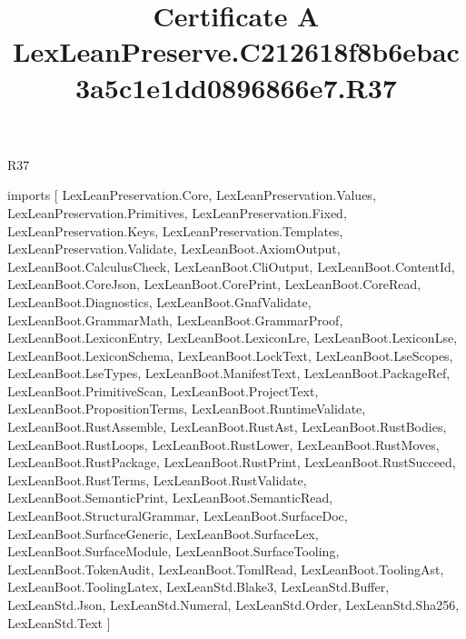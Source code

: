 \begin{lexlean}{R37}
\title{Certificate A LexLeanPreserve.C212618f8b6ebac3a5c1e1dd0896866e7.R37}
\begin{coremodule}
imports [
  LexLeanPreservation.Core,
  LexLeanPreservation.Values,
  LexLeanPreservation.Primitives,
  LexLeanPreservation.Fixed,
  LexLeanPreservation.Keys,
  LexLeanPreservation.Templates,
  LexLeanPreservation.Validate,
  LexLeanBoot.AxiomOutput,
  LexLeanBoot.CalculusCheck,
  LexLeanBoot.CliOutput,
  LexLeanBoot.ContentId,
  LexLeanBoot.CoreJson,
  LexLeanBoot.CorePrint,
  LexLeanBoot.CoreRead,
  LexLeanBoot.Diagnostics,
  LexLeanBoot.GnafValidate,
  LexLeanBoot.GrammarMath,
  LexLeanBoot.GrammarProof,
  LexLeanBoot.LexiconEntry,
  LexLeanBoot.LexiconLre,
  LexLeanBoot.LexiconLse,
  LexLeanBoot.LexiconSchema,
  LexLeanBoot.LockText,
  LexLeanBoot.LseScopes,
  LexLeanBoot.LseTypes,
  LexLeanBoot.ManifestText,
  LexLeanBoot.PackageRef,
  LexLeanBoot.PrimitiveScan,
  LexLeanBoot.ProjectText,
  LexLeanBoot.PropositionTerms,
  LexLeanBoot.RuntimeValidate,
  LexLeanBoot.RustAssemble,
  LexLeanBoot.RustAst,
  LexLeanBoot.RustBodies,
  LexLeanBoot.RustLoops,
  LexLeanBoot.RustLower,
  LexLeanBoot.RustMoves,
  LexLeanBoot.RustPackage,
  LexLeanBoot.RustPrint,
  LexLeanBoot.RustSucceed,
  LexLeanBoot.RustTerms,
  LexLeanBoot.RustValidate,
  LexLeanBoot.SemanticPrint,
  LexLeanBoot.SemanticRead,
  LexLeanBoot.StructuralGrammar,
  LexLeanBoot.SurfaceDoc,
  LexLeanBoot.SurfaceGeneric,
  LexLeanBoot.SurfaceLex,
  LexLeanBoot.SurfaceModule,
  LexLeanBoot.SurfaceTooling,
  LexLeanBoot.TokenAudit,
  LexLeanBoot.TomlRead,
  LexLeanBoot.ToolingAst,
  LexLeanBoot.ToolingLatex,
  LexLeanStd.Blake3,
  LexLeanStd.Buffer,
  LexLeanStd.Json,
  LexLeanStd.Numeral,
  LexLeanStd.Order,
  LexLeanStd.Sha256,
  LexLeanStd.Text
]


\end{coremodule}
\end{lexlean}
